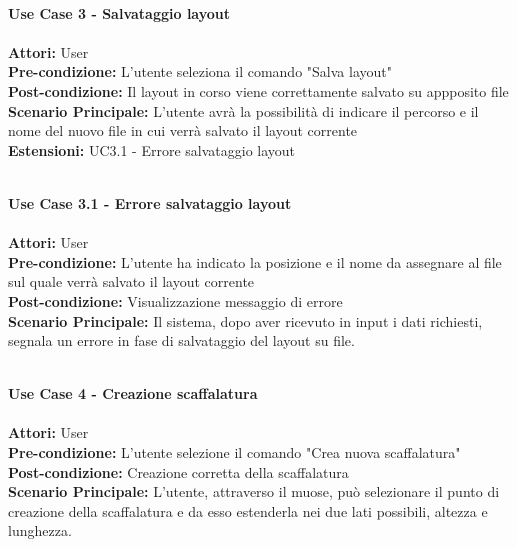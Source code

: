 \Large\textbf{}\\
\Large\textbf{Use Case 3 - Salvataggio layout} \\
\vspace{0.5cm}
\large\textbf{} \\
\textbf{Attori:} User\\
\textbf{Pre-condizione:} L'utente seleziona il comando "Salva layout"\\
\textbf{Post-condizione: } Il layout in corso viene correttamente salvato su appposito file \\
\textbf{Scenario Principale:}  L'utente avrà la possibilità di indicare il percorso e il nome del nuovo file in cui verrà salvato il layout corrente \\ 
\textbf{Estensioni: } UC3.1 - Errore salvataggio layout\\
\vspace{0.5cm}

\Large\textbf{}\\
\Large\textbf{Use Case 3.1 - Errore salvataggio layout} \\
\vspace{0.5cm}
\large\textbf{} \\
\textbf{Attori:} User\\
\textbf{Pre-condizione:} L'utente ha indicato la posizione e il nome da assegnare al file sul quale verrà salvato il layout corrente \\
\textbf{Post-condizione: } Visualizzazione messaggio di errore\\
\textbf{Scenario Principale:}  Il sistema, dopo aver ricevuto in input i dati richiesti, segnala un errore in fase di salvataggio del layout su file.\\
\vspace{0.5cm}

\Large\textbf{}\\
\Large\textbf{Use Case 4 - Creazione scaffalatura} \\
\vspace{0.5cm}
\large\textbf{} \\
\textbf{Attori:} User\\
\textbf{Pre-condizione:} L'utente selezione il comando "Crea nuova scaffalatura" \\
\textbf{Post-condizione: } Creazione corretta della scaffalatura\\
\textbf{Scenario Principale:}  L'utente, attraverso il muose, può selezionare il punto di creazione della scaffalatura e da esso estenderla nei due lati possibili, altezza e lunghezza. \\
\vspace{0.5cm}

